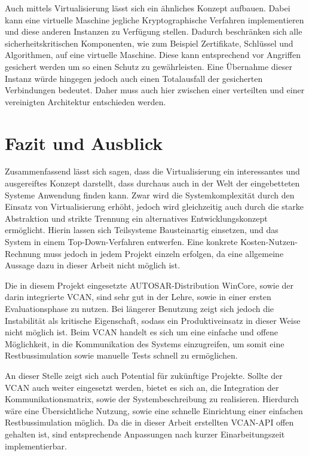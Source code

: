 \documentclass[
  a4paper,					    %
  twoside,
  DIV=calc,     				%
  bibliography=totoc,
  cleardoublepage=empty,
  ngerman,     					%
  final       					%
]{scrbook}
\begin{document}
Auch mittels Virtualisierung lässt sich ein ähnliches Konzept aufbauen. Dabei kann eine virtuelle Maschine jegliche Kryptographische Verfahren implementieren und diese anderen Instanzen zu Verfügung stellen. Dadurch beschränken sich alle sicherheitskritischen Komponenten, wie zum Beispiel Zertifikate, Schlüssel und Algorithmen, auf eine virtuelle Maschine. Diese kann entsprechend vor Angriffen gesichert werden um so einen Schutz zu gewährleisten. Eine Übernahme dieser Instanz würde hingegen jedoch auch einen Totalausfall der gesicherten Verbindungen bedeutet. Daher muss auch hier zwischen einer verteilten und einer vereinigten Architektur entschieden werden.








\chapter{Fazit und Ausblick}
\label{sec:FazitAusblick}
Zusammenfassend lässt sich sagen, dass die Virtualisierung ein interessantes und ausgereiftes Konzept darstellt, dass durchaus auch in der Welt der eingebetteten Systeme Anwendung finden kann. Zwar wird die Systemkomplexität durch den Einsatz von Virtualisierung erhöht, jedoch wird gleichzeitig auch durch die starke Abstraktion und strikte Trennung ein alternatives Entwicklungskonzept ermöglicht. Hierin lassen sich Teilsysteme Bausteinartig einsetzen, und das System in einem Top-Down-Verfahren entwerfen. Eine konkrete Kosten-Nutzen-Rechnung muss jedoch in jedem Projekt einzeln erfolgen, da eine allgemeine Aussage dazu in dieser Arbeit nicht möglich ist.

Die in diesem Projekt eingesetzte AUTOSAR-Distribution WinCore, sowie der darin integrierte VCAN, sind sehr gut in der Lehre, sowie in einer ersten Evaluationsphase zu nutzen. Bei längerer Benutzung zeigt sich jedoch die Instabilität als kritische Eigenschaft, sodass ein Produktiveinsatz in dieser Weise nicht möglich ist. Beim VCAN handelt es sich um eine einfache und offene Möglichkeit, in die Kommunikation des Systems einzugreifen, um somit eine Restbussimulation sowie manuelle Tests schnell zu ermöglichen.

An dieser Stelle zeigt sich auch Potential für zukünftige Projekte. Sollte der VCAN auch weiter eingesetzt werden, bietet es sich an, die Integration der Kommunikationsmatrix, sowie der Systembeschreibung zu realisieren. Hierdurch wäre eine Übersichtliche Nutzung, sowie eine schnelle Einrichtung einer einfachen Restbussimulation möglich. Da die in dieser Arbeit erstellten VCAN-API offen gehalten ist, sind entsprechende Anpassungen nach kurzer Einarbeitungszeit implementierbar.
\end{document}
